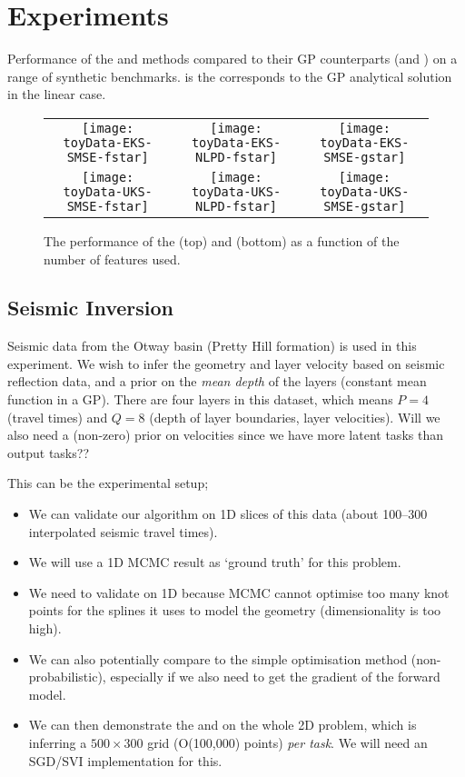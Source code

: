 \section{Experiments}
\begin{table*}
\caption{Performance of the \eks and \uks methods compared to their GP counterparts (\egp and \ugp) on a range of synthetic benchmarks. 
\gp is the corresponds to the GP analytical solution in the linear case.
}
\begin{center}

\end{center}
\end{table*}
%
\begin{figure*}
\centering
\begin{tabular}{c c c}
\texttt{[image: toyData-EKS-SMSE-fstar]} &
\texttt{[image: toyData-EKS-NLPD-fstar]} &
\texttt{[image: toyData-EKS-SMSE-gstar]} \\
\texttt{[image: toyData-UKS-SMSE-fstar]} &
\texttt{[image: toyData-UKS-NLPD-fstar]} &
\texttt{[image: toyData-UKS-SMSE-gstar]} \\
\end{tabular}
\caption{The performance of the \eks (top) and \uks (bottom) as a function of the number of features used. }
\end{figure*}

\subsection{Seismic Inversion}

Seismic data from the Otway basin (Pretty Hill formation) is used in this
experiment. We wish to infer the geometry and layer velocity based on seismic
reflection data, and a prior on the \emph{mean depth} of the layers (constant
mean function in a GP). There are four layers in this dataset, which means $P =
4$ (travel times) and $Q = 8$ (depth of layer boundaries, layer velocities).
Will we also need a (non-zero) prior on velocities since we have more latent
tasks than output tasks??

This can be the experimental setup;
\begin{itemize}
    \item We can validate our algorithm on 1D slices of this data (about
        100--300 interpolated seismic travel times).
    \item We will use a 1D MCMC result as `ground truth' for this problem.
    \item We need to validate on 1D because MCMC cannot optimise too many knot
        points for the splines it uses to model the geometry (dimensionality is
        too high).
    \item We can also potentially compare to the simple optimisation method
        (non-probabilistic), especially if we also need to get the gradient of
        the forward model.
    \item We can then demonstrate the \eks and \uks on the whole 2D problem,
        which is inferring a $500\times300$ grid (O(100,000) points) \emph{per
            task}. We will need an SGD/SVI implementation for this.
\end{itemize}
